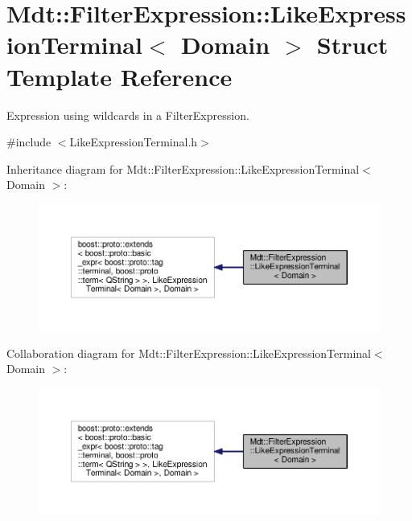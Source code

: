 \hypertarget{struct_mdt_1_1_filter_expression_1_1_like_expression_terminal}{}\section{Mdt\+:\+:Filter\+Expression\+:\+:Like\+Expression\+Terminal$<$ Domain $>$ Struct Template Reference}
\label{struct_mdt_1_1_filter_expression_1_1_like_expression_terminal}


Expression using wildcards in a Filter\+Expression.  




{\ttfamily \#include $<$Like\+Expression\+Terminal.\+h$>$}



Inheritance diagram for Mdt\+:\+:Filter\+Expression\+:\+:Like\+Expression\+Terminal$<$ Domain $>$\+:
\nopagebreak
\begin{figure}[H]
\begin{center}
\leavevmode
\includegraphics[width=350pt]{struct_mdt_1_1_filter_expression_1_1_like_expression_terminal__inherit__graph}
\end{center}
\end{figure}


Collaboration diagram for Mdt\+:\+:Filter\+Expression\+:\+:Like\+Expression\+Terminal$<$ Domain $>$\+:
\nopagebreak
\begin{figure}[H]
\begin{center}
\leavevmode
\includegraphics[width=350pt]{struct_mdt_1_1_filter_expression_1_1_like_expression_terminal__coll__graph}
\end{center}
\end{figure}

